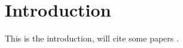 \section{Introduction}
\label{Sec:intro}

This is the introduction, will cite some papers \cite{paper2000}.

